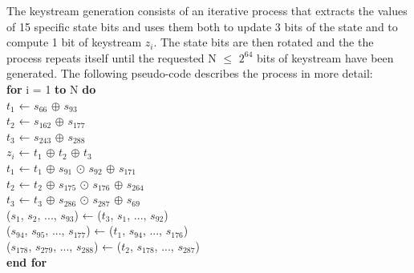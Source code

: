 \begin{enumerate}
	The keystream generation consists of an iterative process that extracts the values of 15 specific state bits and uses them both to update 3 bits of the state and to compute 1 bit of keystream $z_i$. The state bits are then rotated and the
	the process repeats itself until the requested N $\leq$ $2^{64}$ bits of keystream have been generated. The following pseudo-code describes the process in more detail:
	\vspace{0.5em}
	\\
	{\selectfont
		\textbf{for} i = 1 \textbf{to} N \textbf{do}\\
		\indent\hspace{1cm}$t_1$ ← $s_{66}$ $\oplus$ $s_{93}$\\
		\indent\hspace{1cm}$t_2$ ← $s_{162}$ $\oplus$ $s_{177}$\\
		\indent\hspace{1cm}$t_3$ ← $s_{243}$ $\oplus$ $s_{288}$\\
		\indent\hspace{1cm}$z_i$ ← $t_1$ $\oplus$ $t_2$ $\oplus$ $t_3$\\
		\indent\hspace{1cm}$t_1$ ← $t_1$ $\oplus$ $s_{91}$ $\odot$ $s_{92}$ $\oplus$ $s_{171}$\\
		\indent\hspace{1cm}$t_2$ ← $t_2$ $\oplus$ $s_{175}$ $\odot$ $s_{176}$ $\oplus$ $s_{264}$\\
		\indent\hspace{1cm}$t_3$ ← $t_3$ $\oplus$ $s_{286}$ $\odot$ $s_{287}$ $\oplus$ $s_{69}$\\
		\indent\hspace{1cm}($s_1$, $s_2$, ..., $s_{93}$) ← ($t_3$, $s_1$, ..., $s_{92}$)\\
		\indent\hspace{1cm}($s_{94}$, $s_{95}$, ..., $s_{177}$) ← ($t_1$, $s_{94}$, ..., $s_{176}$)\\
		\indent\hspace{1cm}($s_{178}$, $s_{279}$, ..., $s_{288}$) ← ($t_2$, $s_{178}$, ..., $s_{287}$)\\
		\textbf{end for}
	}
\end{enumerate}


